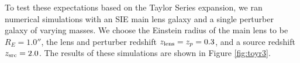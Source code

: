 To test these expectations based on the Taylor Series expansion, we ran numerical simulations with an SIE main lens galaxy and a single perturber galaxy of varying masses. We choose the Einstein radius of the main lens to be $R_E = 1.0''$,  the lens and perturber redshift $z_{\rm{lens}} = z_p = 0.3$, and a source redshift $z_{\rm{src}} = 2.0$. The results of these simulations are shown in Figure \ref{fig:toyr3}.